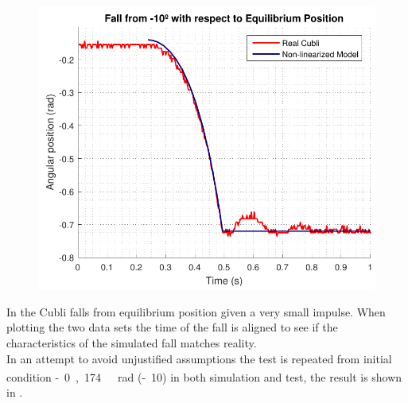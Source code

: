 \begin{minipage}{\linewidth}
\begin{minipage}{0.5\linewidth}
\begin{figure}[H]
			\includegraphics[scale=.55]{figures/FallTestComparison10deg}
			\centering
			\captionsetup{justification=centering}
			\label{FallTestComparison10deg}
		\end{figure}%
	\end{minipage}
\end{minipage}

In  the Cubli falls from equilibrium position given a very small impulse. When plotting the two data sets the time of the fall is aligned to see if the characteristics of the simulated fall matches reality.\\
In an attempt to avoid unjustified assumptions the test is repeated from initial condition \si{-0,174\ rad} (\si{-10^\circ}) in both simulation and test, the result is shown in .


